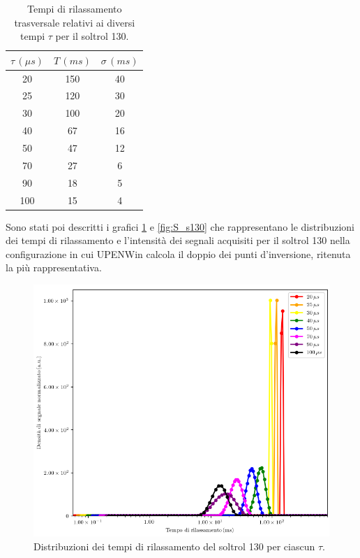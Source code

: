 \begin{table}[h!]
    \begin{center}
    \begin{tabular}{c c c}
    \toprule
    	${\tau}\,({\mu}s)$ & $T\,(ms)$ & ${\sigma}\,(ms)$ \\
    \midrule
	 20 & 150 & 40 \\
	 25 & 120 & 30 \\
	 30 & 100 & 20 \\
	 40 & 67 & 16 \\
	 50 & 47 & 12 \\
	 70 & 27 & 6 \\
	 90 & 18 & 5 \\
	 100 & 15 & 4 \\
    \bottomrule
    \end{tabular}
    \caption{Tempi di rilassamento trasversale relativi ai diversi tempi $\tau$ per il soltrol 130.}
    \label{tab:T_s130}
    \end{center}
\end{table}
\newpage
Sono stati poi descritti i grafici \ref{fig:D_s130} e \ref{fig:S_s130} che rappresentano le distribuzioni dei tempi di rilassamento e l'intensità dei segnali acquisiti per il soltrol 130 nella configurazione in cui UPENWin calcola il doppio dei punti d'inversione, ritenuta la più rappresentativa.

\begin{figure}[h!]
\centering
\includegraphics[width=\columnwidth]{Figure/SOLTROL130.png}
\caption{Distribuzioni dei tempi di rilassamento del soltrol 130 per ciascun $\tau$.}
\label{fig:D_s130}
\end{figure}

